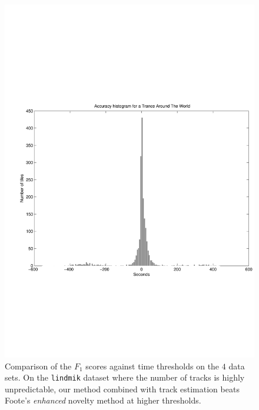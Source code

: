 \documentclass[twocolumn]{article}
\begin{document}
\begin{figure}
\begin{center}
\begin{minipage}[t]{0.45\linewidth}
\begin{center}
				\includegraphics[scale=0.5]{images/tatw}
			\end{center}
		\end{minipage}
		
	\end{center}
	
	\caption{Comparison of the $F_1$ scores against time thresholds on the $4$ data sets. On the \texttt{lindmik} dataset where the number of tracks is highly unpredictable, our method combined with track estimation beats Foote's \textit{enhanced} novelty method at higher thresholds.}
	\label{fig:fscores_breakdown}
		
\end{figure}
\end{document}
